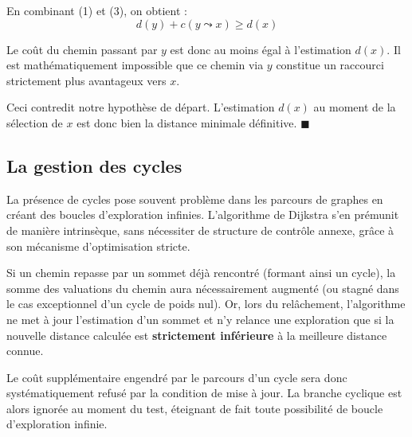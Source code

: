\documentclass[11pt,a4paper]{report}
\begin{document}
	En combinant (1) et (3), on obtient :
	\begin{equation}
		d(y) + c(y \leadsto x) \geq d(x)
	\end{equation}
	
	Le coût du chemin passant par $y$ est donc au moins égal à l'estimation $d(x)$. Il est mathématiquement impossible que ce chemin via $y$ constitue un raccourci strictement plus avantageux vers $x$.
	
	Ceci contredit notre hypothèse de départ. L'estimation $d(x)$ au moment de la sélection de $x$ est donc bien la distance minimale définitive. 
	\hfill $\blacksquare$
	
	
	\subsection{La gestion des cycles}
	La présence de cycles pose souvent problème dans les parcours de graphes en créant des boucles d'exploration infinies. L'algorithme de Dijkstra s'en prémunit de manière intrinsèque, sans nécessiter de structure de contrôle annexe, grâce à son mécanisme d'optimisation stricte.
	
	Si un chemin repasse par un sommet déjà rencontré (formant ainsi un cycle), la somme des valuations du chemin aura nécessairement augmenté (ou stagné dans le cas exceptionnel d'un cycle de poids nul). Or, lors du relâchement, l'algorithme ne met à jour l'estimation d'un sommet et n'y relance une exploration que si la nouvelle distance calculée est \textbf{strictement inférieure} à la meilleure distance connue. 
	
	Le coût supplémentaire engendré par le parcours d'un cycle sera donc systématiquement refusé par la condition de mise à jour. La branche cyclique est alors ignorée au moment du test, éteignant de fait toute possibilité de boucle d'exploration infinie.
	
	
\end{document}
